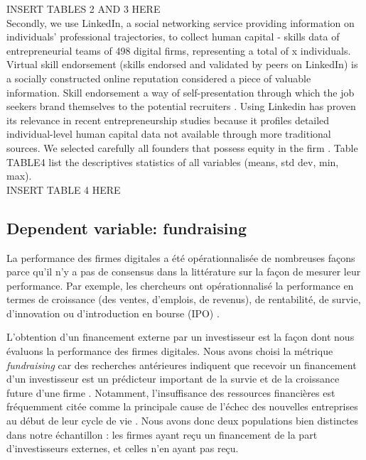 \documentclass[12pt]{article}
\begin{document}
INSERT TABLES 2 AND 3 HERE \\

Secondly, we use LinkedIn, a social networking service providing information on individuals' professional trajectories, to collect human capital - skills data of entrepreneurial teams of 498 digital firms, representing a total of x individuals. Virtual skill endorsement (skills endorsed and validated by peers on LinkedIn) is a socially constructed online reputation considered a piece of valuable information. Skill endorsement a way of self-presentation through which the job seekers brand themselves to the potential recruiters \citep{rapanta2017linkedin}. Using Linkedin has proven its relevance in recent entrepreneurship studies because it profiles detailed individual-level human capital data not available through more traditional sources. We selected carefully all founders that possess equity in the firm \citep{knight2020start, xie2020does}. Table TABLE4 list the descriptives statistics of all variables (means, std dev, min, max). \\

INSERT TABLE 4 HERE

\subsection{Dependent variable: fundraising}

La performance des firmes digitales a été opérationnalisée de nombreuses façons parce qu'il n'y a pas de consensus dans la littérature sur la façon de mesurer leur performance. Par exemple, les chercheurs ont opérationnalisé la performance en termes de croissance (des ventes, d'emplois, de revenus), de rentabilité, de survie, d'innovation ou d'introduction en bourse (IPO) \citep{delmar2003arriving}.

L'obtention d'un financement externe par un investisseur est la façon dont nous évaluons la performance des firmes digitales. Nous avons choisi la métrique \textit{fundraising} car des recherches antérieures indiquent que recevoir un financement d'un investisseur est un prédicteur important de la survie et de la croissance future d'une firme \citep{beckman2007early}. Notamment, l'insuffisance des ressources financières est fréquemment citée comme la principale cause de l'échec des nouvelles entreprises au début de leur cycle de vie \citep{franke2008venture, eddleston2016you}. Nous avons donc deux populations bien distinctes dans notre échantillon : les firmes ayant reçu un financement de la part d'investisseurs externes, et celles n'en ayant pas reçu.
\end{document}
